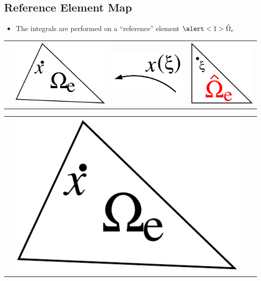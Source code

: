 \subsection*{Reference Element Map}


\begin{frame}[t]
  \begin{block}{}
    \begin{itemize}    
  \item{
    The integrals are performed on a ``reference'' element $\alert<1>{\hat{\Omega}_e}$
    }
  \end{itemize}
  \end{block}
    {
    \begin{tabular}{p{}ccc} \\
      &
      \includegraphics[width=.2\textwidth]{figures/physical_element}&
      \includegraphics[width=.2\textwidth]{figures/map}&
      \includegraphics[width=.15\textwidth]{figures/reference_element_red}
    \end{tabular}
    }
    {
    \begin{tabular}{p{}ccc} \\ 
      &
      \includegraphics[width=.2\textwidth]{figures/physical_element}&

\end{tabular}}
\end{frame}
